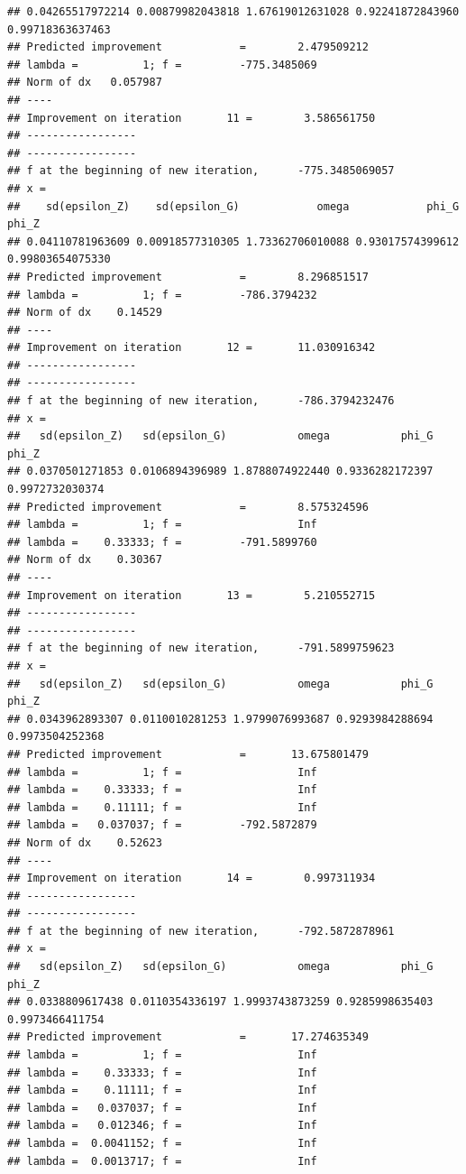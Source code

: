 \documentclass[12pt,a4paper,]{article}
\newcommand{\0}{\mathbf{0}}
\begin{document}
\begin{verbatim}
## 0.04265517972214 0.00879982043818 1.67619012631028 0.92241872843960 0.99718363637463 
## Predicted improvement            =        2.479509212
## lambda =          1; f =         -775.3485069 
## Norm of dx   0.057987
## ----
## Improvement on iteration       11 =        3.586561750
## -----------------
## -----------------
## f at the beginning of new iteration,      -775.3485069057 
## x =
##    sd(epsilon_Z)    sd(epsilon_G)            omega            phi_G            phi_Z 
## 0.04110781963609 0.00918577310305 1.73362706010088 0.93017574399612 0.99803654075330 
## Predicted improvement            =        8.296851517
## lambda =          1; f =         -786.3794232 
## Norm of dx    0.14529
## ----
## Improvement on iteration       12 =       11.030916342
## -----------------
## -----------------
## f at the beginning of new iteration,      -786.3794232476 
## x =
##   sd(epsilon_Z)   sd(epsilon_G)           omega           phi_G           phi_Z 
## 0.0370501271853 0.0106894396989 1.8788074922440 0.9336282172397 0.9972732030374 
## Predicted improvement            =        8.575324596
## lambda =          1; f =                  Inf 
## lambda =    0.33333; f =         -791.5899760 
## Norm of dx    0.30367
## ----
## Improvement on iteration       13 =        5.210552715
## -----------------
## -----------------
## f at the beginning of new iteration,      -791.5899759623 
## x =
##   sd(epsilon_Z)   sd(epsilon_G)           omega           phi_G           phi_Z 
## 0.0343962893307 0.0110010281253 1.9799076993687 0.9293984288694 0.9973504252368 
## Predicted improvement            =       13.675801479
## lambda =          1; f =                  Inf 
## lambda =    0.33333; f =                  Inf 
## lambda =    0.11111; f =                  Inf 
## lambda =   0.037037; f =         -792.5872879 
## Norm of dx    0.52623
## ----
## Improvement on iteration       14 =        0.997311934
## -----------------
## -----------------
## f at the beginning of new iteration,      -792.5872878961 
## x =
##   sd(epsilon_Z)   sd(epsilon_G)           omega           phi_G           phi_Z 
## 0.0338809617438 0.0110354336197 1.9993743873259 0.9285998635403 0.9973466411754 
## Predicted improvement            =       17.274635349
## lambda =          1; f =                  Inf 
## lambda =    0.33333; f =                  Inf 
## lambda =    0.11111; f =                  Inf 
## lambda =   0.037037; f =                  Inf 
## lambda =   0.012346; f =                  Inf 
## lambda =  0.0041152; f =                  Inf 
## lambda =  0.0013717; f =                  Inf 

\end{verbatim}
\end{document}
